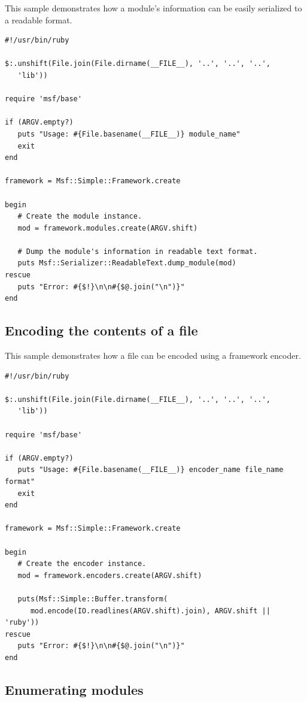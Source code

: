\documentclass{report}
\begin{document}
\par
This sample demonstrates how a module's information can be easily
serialized to a readable format.

\footnotesize{
\begin{verbatim}
#!/usr/bin/ruby

$:.unshift(File.join(File.dirname(__FILE__), '..', '..', '..',
   'lib'))

require 'msf/base'

if (ARGV.empty?)
   puts "Usage: #{File.basename(__FILE__)} module_name"
   exit
end

framework = Msf::Simple::Framework.create

begin
   # Create the module instance.
   mod = framework.modules.create(ARGV.shift)

   # Dump the module's information in readable text format.
   puts Msf::Serializer::ReadableText.dump_module(mod)
rescue
   puts "Error: #{$!}\n\n#{$@.join("\n")}"
end
\end{verbatim}}

        \subsection{Encoding the contents of a file}

\par
This sample demonstrates how a file can be encoded using a framework
encoder.

\footnotesize{
\begin{verbatim}
#!/usr/bin/ruby

$:.unshift(File.join(File.dirname(__FILE__), '..', '..', '..',
   'lib'))

require 'msf/base'

if (ARGV.empty?)
   puts "Usage: #{File.basename(__FILE__)} encoder_name file_name format"
   exit
end

framework = Msf::Simple::Framework.create

begin
   # Create the encoder instance.
   mod = framework.encoders.create(ARGV.shift)

   puts(Msf::Simple::Buffer.transform(
      mod.encode(IO.readlines(ARGV.shift).join), ARGV.shift || 'ruby'))
rescue
   puts "Error: #{$!}\n\n#{$@.join("\n")}"
end
\end{verbatim}}

        \subsection{Enumerating modules}
\end{document}
